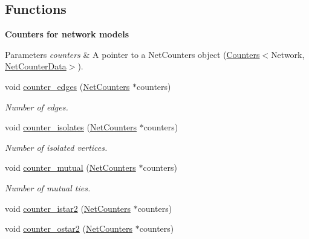 \subsection*{Functions}
\begin{Indent}\textbf{ Counters for network models}\par
{\em 
\begin{DoxyParams}{Parameters}
{\em counters} & A pointer to a {\ttfamily Net\+Counters} object ({\ttfamily \hyperlink{classbarry_1_1_counters}{Counters}}$<${\ttfamily Network}, {\ttfamily \hyperlink{classbarry_1_1counters_1_1network_1_1_net_counter_data}{Net\+Counter\+Data}}$>$). \\
\hline
\end{DoxyParams}
}\begin{DoxyCompactItemize}
\item 
void \hyperlink{namespacebarry_1_1counters_1_1network_ace52a65ee587dfe7b5e815de70350581}{counter\+\_\+edges} (\hyperlink{namespacebarry_1_1counters_1_1network_aa72fdb34752ac24167a06ee196a8fff6}{Net\+Counters} $\ast$counters)
\begin{DoxyCompactList}\small\item\em Number of edges. \end{DoxyCompactList}\item 
void \hyperlink{namespacebarry_1_1counters_1_1network_abb12a5ddff5be1b860139a1a9bc3ff87}{counter\+\_\+isolates} (\hyperlink{namespacebarry_1_1counters_1_1network_aa72fdb34752ac24167a06ee196a8fff6}{Net\+Counters} $\ast$counters)
\begin{DoxyCompactList}\small\item\em Number of isolated vertices. \end{DoxyCompactList}\item 
void \hyperlink{namespacebarry_1_1counters_1_1network_a668c4f3b6abba62e113ae7e382d4b63a}{counter\+\_\+mutual} (\hyperlink{namespacebarry_1_1counters_1_1network_aa72fdb34752ac24167a06ee196a8fff6}{Net\+Counters} $\ast$counters)
\begin{DoxyCompactList}\small\item\em Number of mutual ties. \end{DoxyCompactList}\item 
void \hyperlink{namespacebarry_1_1counters_1_1network_ac1cf7a400dacb5fd40750ba4a0c00e81}{counter\+\_\+istar2} (\hyperlink{namespacebarry_1_1counters_1_1network_aa72fdb34752ac24167a06ee196a8fff6}{Net\+Counters} $\ast$counters)
\item 
void \hyperlink{namespacebarry_1_1counters_1_1network_acbeff158b43d56c1fbf76f8c18891f9b}{counter\+\_\+ostar2} (\hyperlink{namespacebarry_1_1counters_1_1network_aa72fdb34752ac24167a06ee196a8fff6}{Net\+Counters} $\ast$counters)

\end{DoxyCompactItemize}
\end{Indent}
